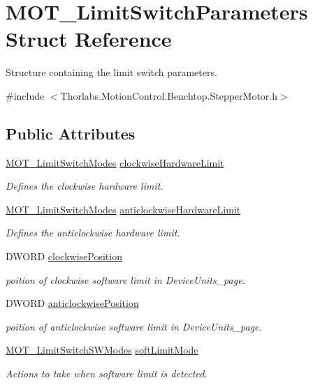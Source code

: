 \hypertarget{struct_m_o_t___limit_switch_parameters}{}\section{M\+O\+T\+\_\+\+Limit\+Switch\+Parameters Struct Reference}
\label{struct_m_o_t___limit_switch_parameters}


Structure containing the limit switch parameters.  




{\ttfamily \#include $<$Thorlabs.\+Motion\+Control.\+Benchtop.\+Stepper\+Motor.\+h$>$}

\subsection*{Public Attributes}
\begin{DoxyCompactItemize}
\item 
\hyperlink{group___common_ga682c3ff98dc472fbdc3cbc3267d38796}{M\+O\+T\+\_\+\+Limit\+Switch\+Modes} \hyperlink{struct_m_o_t___limit_switch_parameters_a47935132686716d6a273b37d4beb496e}{clockwise\+Hardware\+Limit}
\begin{DoxyCompactList}\small\item\em Defines the clockwise hardware limit. \end{DoxyCompactList}\item 
\hyperlink{group___common_ga682c3ff98dc472fbdc3cbc3267d38796}{M\+O\+T\+\_\+\+Limit\+Switch\+Modes} \hyperlink{struct_m_o_t___limit_switch_parameters_a0275e006c7630c21301dace3e5f2db83}{anticlockwise\+Hardware\+Limit}
\begin{DoxyCompactList}\small\item\em Defines the anticlockwise hardware limit. \end{DoxyCompactList}\item 
D\+W\+O\+RD \hyperlink{struct_m_o_t___limit_switch_parameters_a391960e2ffe9ba412627311342e12fbd}{clockwise\+Position}
\begin{DoxyCompactList}\small\item\em poition of clockwise software limit in Device\+Units\+\_\+page. \end{DoxyCompactList}\item 
D\+W\+O\+RD \hyperlink{struct_m_o_t___limit_switch_parameters_a05cfb7ace5292ec96c4647e9043c7057}{anticlockwise\+Position}
\begin{DoxyCompactList}\small\item\em poition of anticlockwise software limit in Device\+Units\+\_\+page. \end{DoxyCompactList}\item 
\hyperlink{group___common_ga7d4db5fc799ed3fd24818bff565afd85}{M\+O\+T\+\_\+\+Limit\+Switch\+S\+W\+Modes} \hyperlink{struct_m_o_t___limit_switch_parameters_a6f99c8d8e7f41502b437867caf046c5d}{soft\+Limit\+Mode}
\begin{DoxyCompactList}\small\item\em Actions to take when software limit is detected. \end{DoxyCompactList}\end{DoxyCompactItemize}


